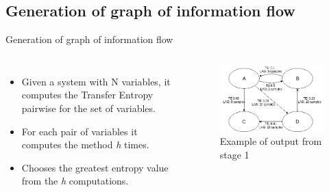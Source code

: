 \subsection{Generation of graph of information flow}
\begin{frame}{Generation of graph of information flow}

    \begin{columns}
            \begin{itemize}
                \item{Given a system with N variables, it computes the Transfer Entropy pairwise for the set of variables.}

                \item{For each pair of variables it computes the method \textit{h} times.}
                
                \item{Chooses the greatest entropy value from the \textit{h} computations.}
            \end{itemize}
            \begin{figure}
                \includegraphics[width=\textwidth]{figuras/graphExample.png}
                \caption{Example of output from stage 1}
            \end{figure}          
    \end{columns}    
\end{frame}


